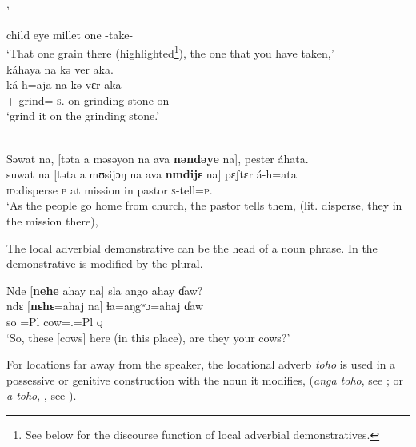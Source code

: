 \ea \label{ex:3:53}\\,\\
\\
      child   eye   millet  one     {\ADJ}   {\DEM}    {\twoS}    {\DEP}-take-{\CL}   {\PSP}\\
\glt  ‘That one grain there (highlighted\footnote{See below for the discourse function of local adverbial demonstratives.}), the one that you have taken,’\\
\medskip
\largerpage
káhaya  na  kə  ver  aka.\\
\gll ká-h=aja     na       kə       vɛr        aka\\
{\twoS}+{\IFV}-grind={\PLU}  \textsc{s}.{\DO}  on   {grinding stone}  on\\
\glt ‘grind it on the grinding stone.’
\z

\ea \label{ex:3:54}\\ 
Səwat  na, [təta  a  məsəyon  na  ava  \textbf{nəndəye}  na],  pester  áhata.\\
\gll  suwat  na   [təta  a  mʊsijɔŋ   na   ava  \textbf{nɪndijɛ}  na]  pɛʃtɛr  á-h=ata\\
      \textsc{id}:disperse  {\PSP}  \textsc{p}      at   mission  {\PSP}  in  {\DEM}  {\PSP}  pastor   \textsc{s}-tell=\textsc{p}.{\IO}\\
\glt  ‘As the people go home from church, the pastor tells them, (lit. disperse, they in the mission there), 
\z

The local adverbial demonstrative can be the head of a noun phrase. In  the demonstrative is modified by the plural. 

\ea \label{ex:3:55}
Nde  [\textbf{nehe}   ahay   na]  sla  ango ahay  ɗaw?\\
\gll  ndɛ    [\textbf{nɛhɛ}=ahaj   na]     ɬa=aŋgʷɔ=ahaj  ɗaw\\
      so     {\DEM}=Pl  {\PSP}  cow={\twoS}.{\POSS}=Pl {\textsc{q}}\\
\glt  ‘So, these [cows] here (in this place), are they your cows?’
\z

For locations far away from the speaker, the locational adverb \textit{toho } is used in a possessive or genitive construction with the noun it modifies, (\textit{anga toho},  see ; or  \textit{a toho}, , see ).

